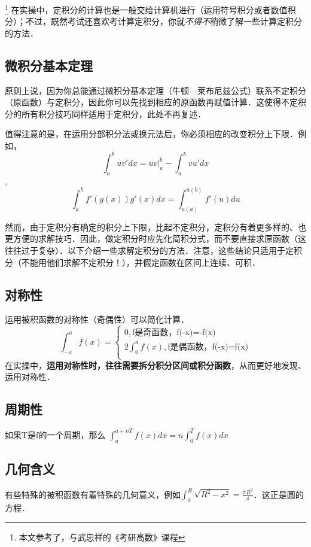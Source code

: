 
\begin{issues}
\issueDraft
\end{issues}
\footnote{本文参考了\cite{同济高}，\cite{Thomas}与武忠祥的《考研高数》课程}
在实操中，定积分的计算也是一般交给计算机进行（运用符号积分或者数值积分）；不过，既然考试还喜欢考计算定积分，你就\textsl{不得不}稍微了解一些计算定积分的方法．

\subsection{微积分基本定理}
原则上说，因为你总能通过微积分基本定理（牛顿—莱布尼兹公式）联系不定积分（原函数）与定积分，因此你可以先找到相应的原函数再赋值计算．这使得不定积分的所有积分技巧同样适用于定积分，此处不再复述．

值得注意的是，在运用分部积分法或换元法后，你必须相应的改变积分上下限．例如，$$\int^b_a uv'dx = uv|^b_a-\int^b_a vu'dx$$, $$\int^b_a f'(g(x))g'(x)dx = \int ^{u(b)}_{u(a)} f'(u)du$$

然而，由于定积分有确定的积分上下限，比起不定积分，定积分有着更多样的、也更方便的求解技巧．因此，做定积分时应先化简积分式，而不要直接求原函数（这往往过于复杂）．以下介绍一些求解定积分的方法．注意，这些结论只适用于定积分（不能用他们求解不定积分！），并假定函数在区间上连续、可积．

\subsection{对称性}
运用被积函数的对称性（奇偶性）可以简化计算．
$$
\int ^a_{-a} f(x) = 
\left \{
\begin{aligned}
0,\text{f是奇函数，f(-x)=-f(x)}\\
2\int ^a_0 f(x),\text{f是偶函数，f(-x)=f(x)}\\
\end{aligned}
\right.
$$
在实操中，\textbf{运用对称性时，往往需要拆分积分区间或积分函数}，从而更好地发现、运用对称性．

\subsection{周期性}
如果T是f的一个周期，那么 $\int ^{a+nT}_{a} f(x)dx= n\int^{T}_0 f(x)dx$

\subsection{几何含义}
有些特殊的被积函数有着特殊的几何意义，例如$\int ^R_0 \sqrt{R^2-x^2}=\frac{\pi R^2}{4}$．这正是圆的方程．

